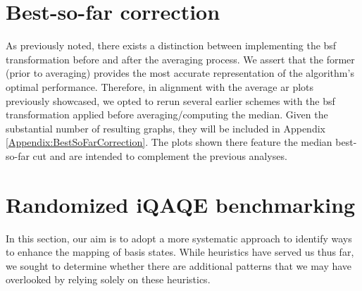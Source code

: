 \section{Best-so-far correction}
\label{section:BSF_correction}




As previously noted, there exists a distinction between implementing the \acrshort{bsf} transformation before and after the averaging process. We assert that the former (prior to averaging) provides the most accurate representation of the algorithm's optimal performance. Therefore, in alignment with the average \acrshort{ar} plots previously showcased, we opted to rerun several earlier schemes with the \acrshort{bsf} transformation applied before averaging/computing the median. Given the substantial number of resulting graphs, they will be included in Appendix \ref{Appendix:BestSoFarCorrection}. The plots shown there feature the median best-so-far cut and are intended to complement the previous analyses.






\section{Randomized iQAQE benchmarking}
\label{section:Randomized_iQAQE_benchmarking}

In this section, our aim is to adopt a more systematic approach to identify ways to enhance the mapping of basis states. While heuristics have served us thus far, we sought to determine whether there are additional patterns that we may have overlooked by relying solely on these heuristics.


